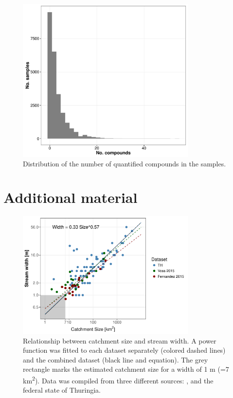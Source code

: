 \documentclass[pdftex,
	a4paper,
	titlepage=false]{scrreprt}
\begin{document}
\begin{figure}[ht]
	\centering
	\includegraphics[width = 0.8\textwidth]{pmix}
	\caption{Distribution of the number of quantified compounds in the samples.}
	\label{fig:pmix}
\end{figure}


\chapter{Additional material}

\begin{figure}[ht]
	\centering
	\includegraphics[width = 0.8\textwidth]{width_size}
	\caption[Relationship between catchment size and stream width.]{Relationship between catchment size and stream width. A power function was fitted to each dataset separately (colored dashed lines) and the combined dataset (black line and equation). The grey rectangle marks the estimated catchment size for a width of 1 m (=7 km\textsuperscript{2}). Data was compiled from three different sources: \citet{Fern2015}, \citet{Voss2015} and the federal state of Thuringia.}
	\label{fig:size_width}
\end{figure}



\end{document}

